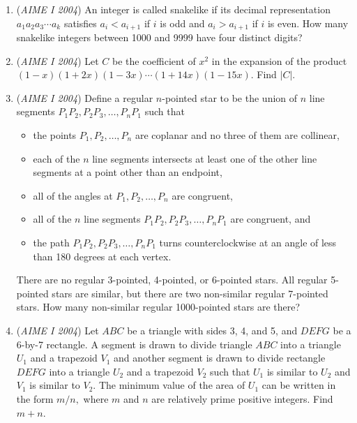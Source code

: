 \begin{enumerate}
 

	\item (\textit{AIME I 2004}) An integer is called snakelike if its decimal representation $a_1a_2a_3\cdots a_k$ satisfies $a_i<a_{i+1}$ if $i$ is odd and $a_i>a_{i+1}$ if $i$ is even. How many snakelike integers between 1000 and 9999 have four distinct digits?


 

	\item (\textit{AIME I 2004}) Let $C$ be the coefficient of $x^2$ in the expansion of the product $(1 - x)(1 + 2x)(1 - 3x)\cdots(1 + 14x)(1 - 15x).$ Find $|C|.$


	\item (\textit{AIME I 2004}) Define a regular $n$-pointed star to be the union of $n$ line segments $P_1P_2, P_2P_3,\ldots, P_nP_1$ such that


 
            \begin{itemize}
        \item the points $P_1, P_2,\ldots, P_n$ are coplanar and no three of them are collinear,

        \item each of the $n$ line segments intersects at least one of the other line segments at a point other than an endpoint,

        \item all of the angles at $P_1, P_2,\ldots, P_n$ are congruent,

        \item all of the $n$ line segments $P_1P_2, P_2P_3,\ldots, P_nP_1$ are congruent, and

        \item the path $P_1P_2, P_2P_3,\ldots, P_nP_1$ turns counterclockwise at an angle of less than 180 degrees at each vertex.
            \end{itemize}
            There are no regular 3-pointed, 4-pointed, or 6-pointed stars. All regular 5-pointed stars are similar, but there are two non-similar regular 7-pointed stars. How many non-similar regular 1000-pointed stars are there?


 

	\item (\textit{AIME I 2004}) Let $ABC$ be a triangle with sides 3, 4, and 5, and $DEFG$ be a 6-by-7 rectangle. A segment is drawn to divide triangle $ABC$ into a triangle $U_1$ and a trapezoid $V_1$ and another segment is drawn to divide rectangle $DEFG$ into a triangle $U_2$ and a trapezoid $V_2$ such that $U_1$ is similar to $U_2$ and $V_1$ is similar to $V_2.$ The minimum value of the area of $U_1$ can be written in the form $m/n,$ where $m$ and $n$ are relatively prime positive integers. Find $m+n.$



\end{enumerate}
